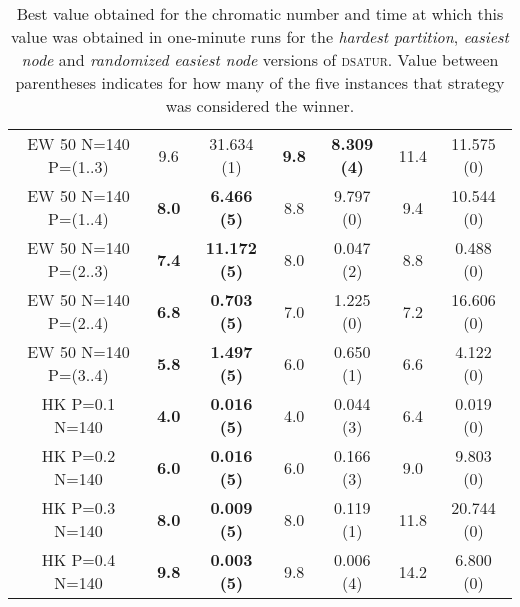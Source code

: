 \begin{table}
\begin{tabular}{|c|cc|cc|cc|}
\\
EW 50 N=140 P=(1..3) & 9.6 & 31.634 (1) & \textbf{9.8} & \textbf{8.309 (4)} & 11.4 & 11.575 (0)
\\
EW 50 N=140 P=(1..4) & \textbf{8.0} & \textbf{6.466 (5)} & 8.8 & 9.797 (0) & 9.4 & 10.544 (0)
\\
EW 50 N=140 P=(2..3) & \textbf{7.4} & \textbf{11.172 (5)} & 8.0 & 0.047 (2) & 8.8 & 0.488 (0)
\\
EW 50 N=140 P=(2..4) & \textbf{6.8} & \textbf{0.703 (5)} & 7.0 & 1.225 (0) & 7.2 & 16.606 (0)
\\
EW 50 N=140 P=(3..4) & \textbf{5.8} & \textbf{1.497 (5)} & 6.0 & 0.650 (1) & 6.6 & 4.122 (0)
\\
\hline
HK P=0.1 N=140 & \textbf{4.0} & \textbf{0.016 (5)} & 4.0 & 0.044 (3) & 6.4 & 0.019 (0)
\\
HK P=0.2 N=140 & \textbf{6.0} & \textbf{0.016 (5)} & 6.0 & 0.166 (3) & 9.0 & 9.803 (0)
\\
HK P=0.3 N=140 & \textbf{8.0} & \textbf{0.009 (5)} & 8.0 & 0.119 (1) & 11.8 & 20.744 (0)
\\
HK P=0.4 N=140 & \textbf{9.8} & \textbf{0.003 (5)} & 9.8 & 0.006 (4) & 14.2 & 6.800 (0)
\\
\hline 
 \end{tabular}
 
\caption{Best value obtained for the chromatic number and time at which this value was obtained in one-minute runs for the \textit{hardest partition}, \textit{easiest node} and \textit{randomized easiest node} versions of \textsc{dsatur}. Value between parentheses indicates for how many of the five instances that strategy was considered the winner.}
\label{table:pdsatur:comp}

\end{table}